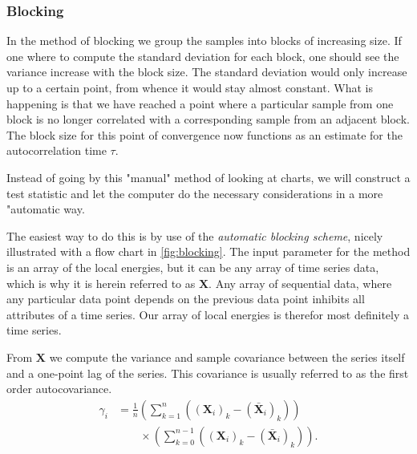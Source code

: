 \documentclass[
    a4paper, aps, twocolumn, floatfix, superscriptaddress,
    nofootinbib]{revtex4-1}
\newcommand{\1}{\mathds{1}}
\begin{document}
        \subsubsection{Blocking}
        In the method of blocking we group the samples into blocks of increasing size. If one where to compute
        the standard deviation for each block, one should see the variance increase with the block size.
        The standard deviation would only increase up to a certain point, from whence it would stay
        almost constant. What is happening is that we have reached a point where a particular
        sample from one block is no longer correlated with a corresponding sample from an adjacent block.
        The block size for this point of convergence now functions as an estimate for the autocorrelation
        time $\tau$.

         Instead of going by this "manual" method of looking at charts, we will construct a test statistic and
         let the computer do the necessary considerations in a more "automatic way.

        The easiest way to do this is by use of the \emph{automatic blocking scheme}, nicely illustrated
        with a flow chart in \autoref{fig:blocking}. The input parameter for the method is an array of the
        local energies, but it can be any array of time series data, which is why it is herein referred to as
        $\mathbf{X}$. Any array of sequential data, where any particular data point depends on the previous
        data point inhibits all attributes of a time series. Our array of local energies is therefor most definitely
        a time series.

        From $\mathbf{X}$ we compute the variance and sample covariance between the series itself and a
        one-point lag of the series. This covariance is usually referred to as the first order autocovariance.
        \begin{align}
            \gamma_i
            &= \frac{1}{n}
            \left(
                \sum_{k=1}^n
                \left((\mathbf{X}_i)_k - (\bar{\mathbf{X}}_i)_k\right)
            \right)
            \nonumber \\
            &\qquad
            \times
            \left(
                \sum_{k=0}^{n-1}
                \left((\mathbf{X}_i)_k - (\bar{\mathbf{X}}_i)_k\right)
            \right).
        \end{align}
\end{document}
